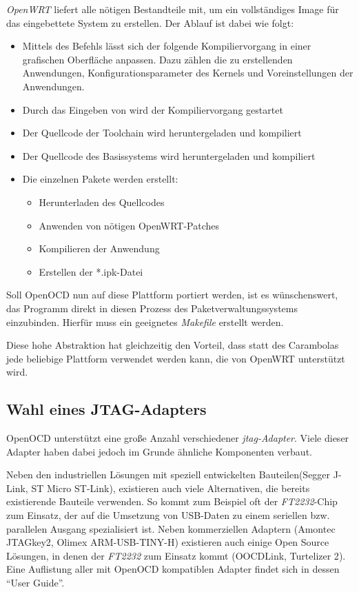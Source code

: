 \emph{OpenWRT} liefert alle nötigen Bestandteile mit, um ein vollständiges Image
für das eingebettete System zu erstellen.
Der Ablauf ist dabei wie folgt:
\begin{itemize}
  \item Mittels des Befehls  lässt sich der folgende
  Kompiliervorgang in einer grafischen Oberfläche anpassen. Dazu zählen die zu
  erstellenden Anwendungen, Konfigurationsparameter des Kernels und
  Voreinstellungen der Anwendungen.
  \item Durch das Eingeben von  wird der Kompiliervorgang
  gestartet
  \item Der Quellcode der Toolchain wird heruntergeladen und kompiliert
  \item Der Quellcode des Basissystems wird heruntergeladen und kompiliert
  \item Die einzelnen Pakete werden erstellt:
  \begin{itemize}
    \item Herunterladen des Quellcodes
    \item Anwenden von nötigen OpenWRT-Patches
    \item Kompilieren der Anwendung
    \item Erstellen der *.ipk-Datei
  \end{itemize}
\end{itemize}

Soll OpenOCD nun auf diese Plattform portiert werden, ist es wünschenswert,
das Programm direkt in diesen Prozess des Paketverwaltungssystems einzubinden.
Hierfür muss ein geeignetes \emph{Makefile} erstellt werden.

Diese hohe Abstraktion hat gleichzeitig den Vorteil, dass statt des Carambolas
jede beliebige Plattform verwendet werden kann, die von OpenWRT unterstützt
wird.

\subsection{Wahl eines JTAG-Adapters}
OpenOCD unterstützt eine große Anzahl verschiedener \emph{\gls{jtag}-Adapter}.
Viele dieser Adapter haben dabei jedoch im Grunde ähnliche Komponenten verbaut.

Neben den industriellen Lösungen mit speziell entwickelten Bauteilen(Segger
J-Link\cite{SEG}, ST Micro ST-Link\cite{STM01}), existieren auch viele
Alternativen, die bereits existierende Bauteile verwenden. So kommt zum Beispiel oft der
\emph{FT2232}-Chip zum Einsatz, der auf die Umsetzung von USB-Daten zu einem
seriellen bzw. parallelen Ausgang spezialisiert ist. Neben kommerziellen
Adaptern (Amontec JTAGkey2\cite{AMO}, Olimex ARM-USB-TINY-H\cite{OLI})
existieren auch einige Open Source Lösungen, in denen der \emph{FT2232} zum
Einsatz kommt (OOCDLink\cite{OCDL}, Turtelizer 2\cite{TURT}). Eine Auflistung
aller mit OpenOCD kompatiblen Adapter findet sich in dessen "`User Guide"'\cite{OOCD}.


